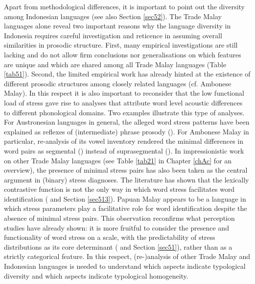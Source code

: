 Apart from methodological differences, it is important to point out the diversity among Indonesian languages (see also Section \ref{sec52}). The Trade Malay languages alone reveal two important reasons why the language diversity in Indonesia requires careful investigation and reticence in assuming overall similarities in prosodic structure. First, many empirical investigations are still lacking and do not allow firm conclusions nor generalisations on which features are unique and which are shared among all Trade Malay languages (Table \ref{tab51}). Second, the limited empirical work has already hinted at the existence of different prosodic structures among closely related languages (cf. Ambonese Malay). In this respect it is also important to reconsider that the low functional load of stress gave rise to analyses that attribute word level acoustic differences to different phonological domains. Two examples illustrate this type of analyses. For Austronesian languages in general, the alleged word stress patterns have been explained as reflexes of (intermediate) phrase prosody (\citealt{goedemans_no_2014}). For Ambonese Malay in particular, re-analysis of its vowel inventory rendered the minimal differences in word pairs as segmental (\citealt{maskikit-essed_no_2016}) instead of suprasegmental (\citealt{vanminde_malayu_1997}). In impressionistic work on other Trade Malay languages (see Table \ref{tab21} in Chapter \ref{chAc} for an overview), the presence of minimal stress pairs has also been taken as the central argument in (binary) stress diagnoses. The literature has shown that the lexically contrastive function is not the only way in which word stress facilitates word identification (\citealt{cutler_native_2012} and Section \ref{sec513}). Papuan Malay appears to be a language in which stress parameters play a facilitative role for word identification despite the absence of minimal stress pairs. This observation reconfirms what perception studies have already shown: it is more fruitful to consider the presence and functionality of word stress on a scale, with the predictability of stress distributions as its core determinant (\citealt{peperkamp_perception_2010} and Section \ref{sec51}), rather than as a strictly categorical feature. In this respect, (re-)analysis of other Trade Malay and Indonesian languages is needed to understand which aspects indicate typological diversity and which aspects indicate typological homogeneity. \par
